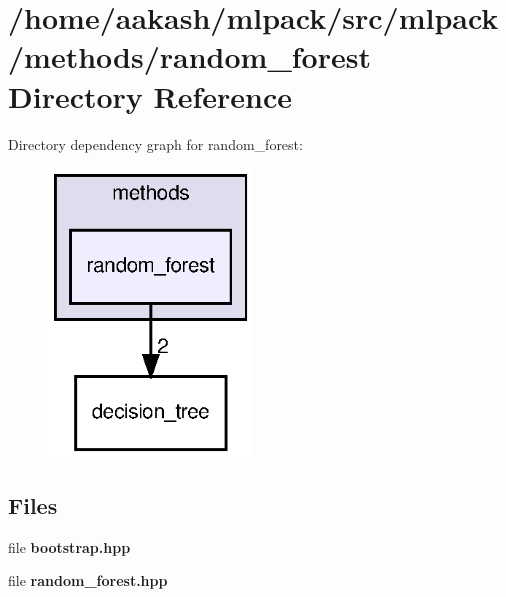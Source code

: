 \section{/home/aakash/mlpack/src/mlpack/methods/random\+\_\+forest Directory Reference}
\label{dir_647ca7f075af87cf7313a37b2d87018c}
Directory dependency graph for random\+\_\+forest\+:
\nopagebreak
\begin{figure}[H]
\begin{center}
\leavevmode
\includegraphics[width=154pt]{dir_647ca7f075af87cf7313a37b2d87018c_dep}
\end{center}
\end{figure}
\subsection*{Files}
\begin{DoxyCompactItemize}
\item 
file \textbf{ bootstrap.\+hpp}
\item 
file \textbf{ random\+\_\+forest.\+hpp}
\end{DoxyCompactItemize}
